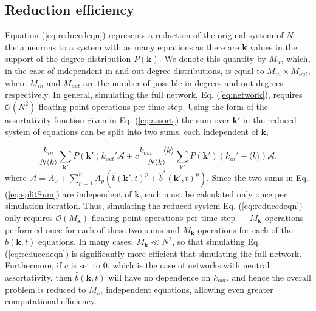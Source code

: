 \documentclass[%
 aip,
 sd,%
 amsmath,amssymb,
 reprint,%
]{revtex4-1}
\begin{document}
\subsection*{Reduction efficiency}
Equation (\ref{eq:reducedeqn}) represents a reduction of the original system of $N$ theta neurons to a system with as many equations as there are \textbf{k} values in the support of the degree distribution $P(\mathbf{k})$. We denote this quantity by $M_{\mathbf{k}}$, which, in the case of independent in and out-degree distributions, is equal to $M_{in} \times M_{out}$, where $M_{in}$ and $M_{out}$ are the number of possible in-degrees and out-degrees respectively. In general, simulating the full network, Eq. (\ref{eq:network}), requires $\mathcal{O}(N^2)$ floating point operations per time step. Using the form of the assortativity function given in Eq. (\ref{eq:assort}) the sum over $\mathbf{k'}$ in the reduced system of equations can be split into two sums, each independent of $\mathbf{k}$,

\begin{equation} \label{eq:splitSum}
\frac{k_{in}}{N \langle k \rangle} \sum_{\mathbf{k'}} P(\mathbf{k'}) k_{out}'  \mathcal{A}  + c \frac{k_{out}-\langle k \rangle}{N \langle k \rangle}  \sum_{\mathbf{k'}} P(\mathbf{k'})  (k_{in}' - \langle k \rangle) \mathcal{A}. 
\end{equation}
where $\mathcal{A} =  A_0 + \sum_{p=1}^n A_p \left(\hat b(\mathbf{k'}, t)^p + \hat b^*(\mathbf{k'}, t)^p\right)$. 
Since the two sums in Eq. (\ref{eq:splitSum}) are independent of $\mathbf{k}$, each must be calculated only once per simulation iteration. Thus, simulating the reduced system Eq. (\ref{eq:reducedeqn}) only requires $\mathcal{O}(M_{\mathbf{k}})$ floating point operations per time step --- $M_{\mathbf{k}}$ operations performed once for each of these two sums and $M_{\mathbf{k}}$ operations for each of the $\hat b(\mathbf{k},t)$ equations. In many cases, $M_{\mathbf{k}} \ll N^2$, so that simulating Eq. (\ref{eq:reducedeqn}) is significantly more efficient that simulating the full network. Furthermore, if $c$ is set to $0$, which is the case of networks with neutral assortativity, then $\hat b(\mathbf{k}, t)$ will have no dependence on $k_{out}$, and hence the overall problem is reduced to $M_{in}$ independent equations, allowing even greater computational efficiency.
\end{document}
